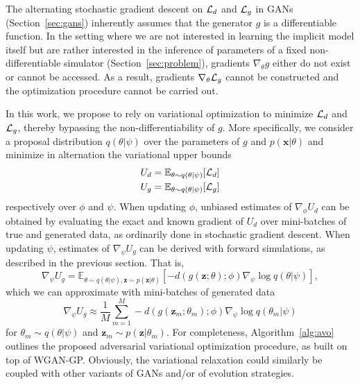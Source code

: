 \documentclass[twocolumn,superscriptaddress,aps]{revtex4-1}
\theoremstyle{plain}
\begin{document}
The alternating stochastic gradient descent on ${\cal L}_d$ and ${\cal L}_g$ in
GANs (Section~\ref{sec:gans}) inherently assumes that the generator $g$ is a differentiable function. In
the setting where we are not interested in learning the implicit model itself but are
rather interested in the inference of parameters of a fixed
non-differentiable simulator (Section~\ref{sec:problem}),
gradients $\nabla_\theta g$ either do not exist or cannot be accessed. As a
result, gradients $\nabla_\theta {\cal L}_g$ cannot be constructed and the
optimization procedure cannot be carried out.

In this work, we propose to rely on variational optimization to minimize ${\cal
L}_d$ and ${\cal L}_g$, thereby bypassing the non-differentiability of $g$. More
specifically, we consider a proposal distribution $q(\theta|\psi)$ over the
parameters of $g$ and $p(\mathbf{x}|\theta)$ and minimize in alternation the variational upper bounds
\begin{align}
    U_d &= \mathbb{E}_{\theta \sim q(\theta|\psi)} [ {\cal L}_d ] \label{eqn:vo-ud} \\
    U_g &= \mathbb{E}_{\theta \sim q(\theta|\psi)} [ {\cal L}_g ] \label{eqn:vo-ug}
\end{align} respectively over $\phi$ and $\psi$.
When updating
$\phi$, unbiased estimates of $\nabla_\phi U_d$ can be obtained by
evaluating the exact and known gradient of $U_d$ over mini-batches of true and
generated data, as ordinarily done in stochastic gradient descent. When updating
$\psi$, estimates of $\nabla_\psi U_g$ can be derived with forward
simulations, as described in the previous section.
That is,
\begin{equation}
    \nabla_\psi U_g = \mathbb{E}_{\theta \sim q(\theta|\psi), \mathbf{z} \sim p(\mathbf{z}|\theta)}  [-d(g(\mathbf{z};\theta);\phi) \nabla_\psi \log q(\theta|\psi)],
\end{equation} which we can approximate with mini-batches of
generated data
\begin{equation}
    \nabla_\psi U_g \approx \frac{1}{M} \sum_{m=1}^M -d(g(\mathbf{z}_m; \theta_m); \phi) \nabla_\psi \log q(\theta_m|\psi)
\end{equation}
for $\theta_m \sim q(\theta|\psi)$ and $\mathbf{z}_m \sim p(\mathbf{z}|\theta_m)$.
For completeness, Algorithm~\ref{alg:avo} outlines the proposed adversarial variational
optimization procedure, as built on top of WGAN-GP.
Obviously, the variational relaxation could similarly be coupled with
other variants of GANs and/or of evolution strategies.
\end{document}
